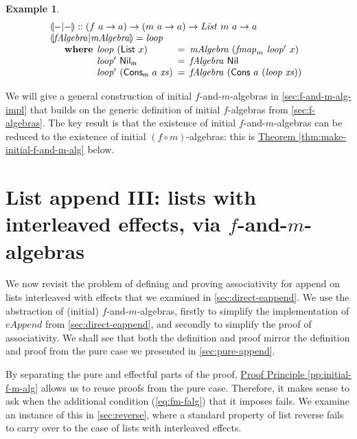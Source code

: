\documentclass{jfp1}
\newcommand{\eFold}[2]{\llparenthesis #1|#2 \rrparenthesis}
\newtheorem{example}{Example}
\newcommand{\proofprinref}[1]{\hyperref[#1]{Proof Principle \ref*{#1}}}
\newcommand{\thmref}[1]{\hyperref[#1]{Theorem \ref*{#1}}}
\newcommand{\kw}[1]{\textbf{#1}}
\begin{document}
\begin{example}
\begin{displaymath}
\begin{array}{l}
      \eFold{-}{-} :: (f~a \to a) \to (m~a \to a) \to \mathit{List}~m~a \to a \\
      \eFold{\mathit{fAlgebra}}{\mathit{mAlgebra}} = \mathit{loop} \\
      \quad\begin{array}{r@{\hspace{0.4em}}l@{\hspace{0.5em}}c@{\hspace{0.5em}}l}
        \kw{where} & \mathit{loop}~(\mathsf{List}~x) &=& \mathit{mAlgebra}~(\mathit{fmap}_m~\mathit{loop'}~x) \\
        & \mathit{loop'}~\mathsf{Nil_m}& = & \mathit{fAlgebra}~\mathsf{Nil} \\
        & \mathit{loop'}~(\mathsf{Cons_m}~a~\mathit{xs}) &=& \mathit{fAlgebra}~(\mathsf{Cons}~a~(\mathit{loop}~\mathit{xs}))
      \end{array}
    \end{array}
  \end{displaymath}
\end{example}
We will give a general construction of initial $f$-and-$m$-algebras in
\autoref{sec:f-and-m-alg-impl} that builds on the generic definition
of initial $f$-algebras from \autoref{sec:f-algebras}. The key result
is that the existence of initial $f$-and-$m$-algebras can be reduced
to the existence of initial $(f \circ m)$-algebras: this is
\thmref{thm:make-initial-f-and-m-alg} below.

\section{List append III: lists with interleaved effects, via \texorpdfstring{$f$}{f}-and-\texorpdfstring{$m$}{m}-algebras}
\label{sec:f-and-m-append}

We now revisit the problem of defining and proving associativity for
append on lists interleaved with effects that we examined in
\autoref{sec:direct-eappend}. We use the abstraction of (initial)
$f$-and-$m$-algebras, firstly to simplify the implementation of
$\mathit{eAppend}$ from \autoref{sec:direct-eappend}, and secondly to
simplify the proof of associativity. We shall see that both the
definition and proof mirror the definition and proof from the
pure case we presented in \autoref{sec:pure-append}.

By separating the pure and effectful parts of the proof,
\proofprinref{pp:initial-f-m-alg} allows us to reuse proofs from the
pure case. Therefore, it makes sense to ask when the additional
condition (\autoref{eq:fm-falg}) that it imposes fails. We examine an
instance of this in \autoref{sec:reverse}, where a standard property
of list reverse fails to carry over to the case of lists with
interleaved effects.
\end{document}
